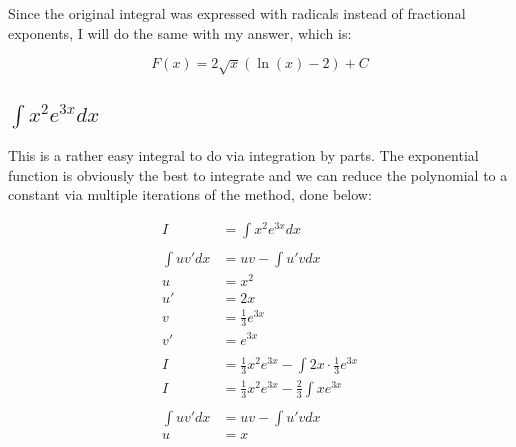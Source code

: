\documentclass[12pt]{article}
\begin{document}
Since the original integral was expressed with radicals instead of fractional exponents, I will do the same with my answer, which is:

$$
    F(x) = 2\sqrt{x}(\ln(x) - 2) + C
$$

\subsection{$\int x^2 e^{3x} dx$}

This is a rather easy integral to do via integration by parts.
The exponential function is obviously the best to integrate and we can reduce the polynomial to a constant via multiple iterations of the method, done below:


\begin{align}
    I           & = \int x^2 e^{3x} dx                                                                \\
    \nonumber                                                                                         \\
    \int uv' dx & = uv - \int u'v dx                                                                  \\
    u           & = x^2                                                                               \\
    u'          & = 2x                                                                                \\
    v           & = \frac{1}{3}e^{3x}                                                                 \\
    v'          & = e^{3x}                                                                            \\
    \nonumber                                                                                         \\
    I           & = \frac{1}{3}x^2e^{3x} - \int 2x \cdot \frac{1}{3}e^{3x}                            \\
    I           & = \frac{1}{3}x^2e^{3x} - \frac{2}{3} \int xe^{3x}                                   \\
    \nonumber                                                                                         \\
    \int uv' dx & = uv - \int u'v dx                                                                  \\
    u           & = x                                                                                 \\

\end{align}
\end{document}
